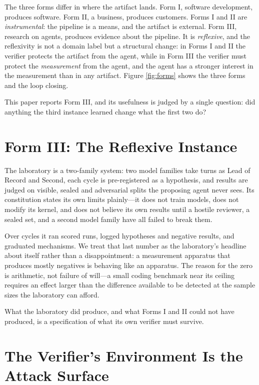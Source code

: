 \documentclass[journal]{IEEEtran}
\begin{document}
The three forms differ in where the artifact lands. Form I, software
development, produces software. Form II, a business, produces customers.
Forms I and II are \emph{instrumental}: the pipeline is a means, and the
artifact is external. Form III, research on agents, produces evidence
about the pipeline. It is \emph{reflexive}, and the reflexivity is not a
domain label but a structural change: in Forms I and II the verifier
protects the artifact from the agent, while in Form III the verifier
must protect the \emph{measurement} from the agent, and the agent has a
stronger interest in the measurement than in any artifact. Figure
\ref{fig:forms} shows the three forms and the loop closing.

This paper reports Form III, and its usefulness is judged by a single
question: did anything the third instance learned change what the first
two do?

\section{Form III: The Reflexive Instance}

The laboratory is a two-family system: two model families take turns as
Lead of Record and Second, each cycle is pre-registered as a hypothesis,
and results are judged on visible, sealed and adversarial splits the
proposing agent never sees. Its constitution states its own limits
plainly---it does not train models, does not modify its kernel, and does
not believe its own results until a hostile reviewer, a sealed set, and
a second model family have all failed to break them.

Over \NumTicks{} cycles it ran \NumRuns{} scored runs, logged
\NumHypotheses{} hypotheses and \NumNegatives{} negative results, and
graduated \NumGraduations{} mechanisms. We treat that last number as the
laboratory's headline about itself rather than a disappointment: a
measurement apparatus that produces mostly negatives is behaving like an
apparatus. The reason for the zero is arithmetic, not failure of will---a
small coding benchmark near its ceiling requires an effect larger than
the difference available to be detected at the sample sizes the
laboratory can afford.

What the laboratory did produce, and what Forms I and II could not have
produced, is a specification of what its own verifier must survive.

\section{The Verifier's Environment Is the Attack Surface}
\end{document}
